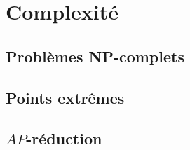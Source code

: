 \section{Complexité}\label{sec:s_1}

\subsection{Problèmes NP-complets}\label{subsec:ss1_1}




\subsection{Points extrêmes}\label{subsec:ss1_2}


% 
% 

\subsection{\(AP\)-réduction}\label{subsec:ss1_4}
% 
\setcounter{tdcounter}{6}
